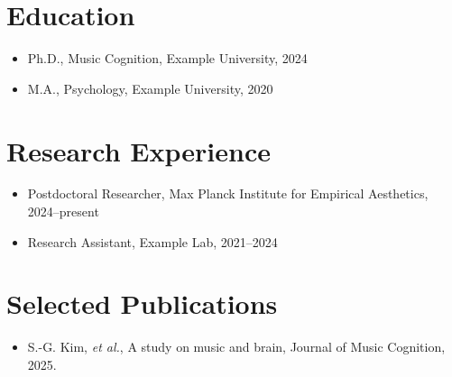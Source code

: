 \documentclass[11pt, a4paper]{article}
\begin{document}
\cvheader

\section*{Education}
\begin{itemize}
  \item Ph.D., Music Cognition, Example University, 2024
  \item M.A., Psychology, Example University, 2020
\end{itemize}

\section*{Research Experience}
\begin{itemize}
  \item Postdoctoral Researcher, Max Planck Institute for Empirical Aesthetics, 2024--present
  \item Research Assistant, Example Lab, 2021--2024
\end{itemize}

\section*{Selected Publications}
\begin{itemize}
  \item S.-G. Kim, \textit{et al.}, A study on music and brain, Journal of Music Cognition, 2025.
\end{itemize}
\end{document}
